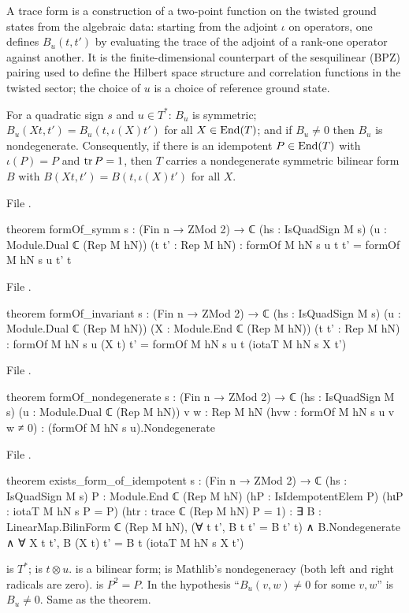 \begin{physics}
A trace form is a construction of a two-point function on the twisted ground states from the algebraic data: starting from the adjoint $\iota$ on operators, one defines $B_u(t,t')$ by evaluating the trace of the adjoint of a rank-one operator against another. It is the finite-dimensional counterpart of the sesquilinear (BPZ) pairing used to define the Hilbert space structure and correlation functions in the twisted sector; the choice of $u$ is a choice of reference ground state.
\end{physics}
\begin{theorem}\label{ch06:thm:formOf}
For a quadratic sign $s$ and $u\in T^*$: $B_u$ is symmetric; $B_u(Xt,t')=B_u(t,\iota(X)t')$ for all
$X\in\operatorname{End}(T)$; and if $B_u\ne0$ then $B_u$ is nondegenerate.  Consequently, if there is an
idempotent $P\in\operatorname{End}(T)$ with $\iota(P)=P$ and $\operatorname{tr} P=1$, then $T$ carries a nondegenerate symmetric
bilinear form $B$ with $B(Xt,t')=B(t,\iota(X)t')$ for all $X$.
\end{theorem}
\noindent File .
\begin{leancode}
theorem formOf_symm {s : (Fin n → ZMod 2) → ℂ} (hs : IsQuadSign M s)
    (u : Module.Dual ℂ (Rep M hN)) (t t' : Rep M hN) :
    formOf M hN s u t t' = formOf M hN s u t' t
\end{leancode}
\noindent File .
\begin{leancode}
theorem formOf_invariant {s : (Fin n → ZMod 2) → ℂ} (hs : IsQuadSign M s)
    (u : Module.Dual ℂ (Rep M hN)) (X : Module.End ℂ (Rep M hN)) (t t' : Rep M hN) :
    formOf M hN s u (X t) t' = formOf M hN s u t (iotaT M hN s X t')
\end{leancode}
\noindent File .
\begin{leancode}
theorem formOf_nondegenerate {s : (Fin n → ZMod 2) → ℂ} (hs : IsQuadSign M s)
    (u : Module.Dual ℂ (Rep M hN)) {v w : Rep M hN} (hvw : formOf M hN s u v w ≠ 0) :
    (formOf M hN s u).Nondegenerate
\end{leancode}
\noindent File .
\begin{leancode}
theorem exists_form_of_idempotent {s : (Fin n → ZMod 2) → ℂ} (hs : IsQuadSign M s)
    {P : Module.End ℂ (Rep M hN)} (hP : IsIdempotentElem P) (hιP : iotaT M hN s P = P)
    (htr : trace ℂ (Rep M hN) P = 1) :
    ∃ B : LinearMap.BilinForm ℂ (Rep M hN), (∀ t t', B t t' = B t' t) ∧ B.Nondegenerate ∧
      ∀ X t t', B (X t) t' = B t (iotaT M hN s X t')
\end{leancode}
\begin{dictionary}
 is $T^*$;  is $t\otimes u$.  
is a bilinear form;  is Mathlib's nondegeneracy (both left and right
radicals are zero).   is $P^2=P$.  In  the
hypothesis ``$B_u(v,w)\ne0$ for some $v,w$'' is $B_u\ne0$.  Same as the theorem.
\end{dictionary}

